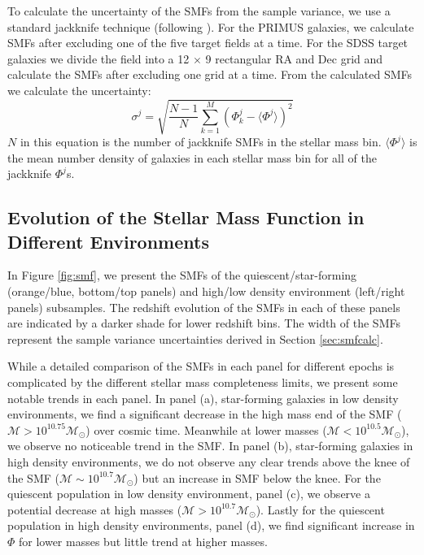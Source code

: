 \documentclass{emulateapj}
\begin{document}
To calculate the uncertainty of the SMFs from the sample variance, we use a standard jackknife technique (following \citealt{Moustakas:2013aa}). For the PRIMUS galaxies, we calculate SMFs after excluding one of the five target fields at a time. For the SDSS target galaxies we divide the field into a 12 $\times$ 9 rectangular RA and Dec grid and calculate the SMFs after excluding one grid at a time. From the calculated SMFs we calculate the uncertainty: 
\begin{equation}
\sigma^j = \sqrt{\frac{N-1}{N} \sum\limits_{k=1}^{M} (\Phi^j_k - \langle \Phi^j \rangle)^2}
\end{equation} 
$N$ in this equation is the number of jackknife SMFs in the stellar mass bin. $\langle \Phi^j \rangle$ is the mean number density of galaxies in each stellar mass bin for all of the jackknife $\Phi^j$s. 

\subsection{Evolution of the Stellar Mass Function in Different Environments} \label{sec:smfevol}
In Figure \ref{fig:smf}, we present the SMFs of the quiescent/star-forming (orange/blue, bottom/top panels) and high/low density environment (left/right panels) subsamples. The redshift evolution of the SMFs in each of these panels are indicated by a darker shade for lower redshift bins. The width of the SMFs represent the sample variance uncertainties derived in Section \ref{sec:smfcalc}.

While a detailed comparison of the SMFs in each panel for different
epochs is complicated by the different stellar mass completeness limits, we present some notable trends in each panel. In panel (a), star-forming galaxies in low density environments, we find a significant decrease in the high mass end of the SMF ($\mathcal{M} > 10^{10.75} \mathcal{M}_{\odot}$) over cosmic time. Meanwhile at lower masses ($\mathcal{M} < 10^{10.5} \mathcal{M}_{\odot}$), we observe no noticeable trend in the SMF. In panel (b), star-forming galaxies in high density environments, we do not observe any clear trends above the knee of the SMF ($\mathcal{M} \sim 10^{10.7} \mathcal{M}_{\odot}$) but an increase in SMF below the knee. For the quiescent population in low density environment, panel (c), we observe a potential decrease at high masses ($\mathcal{M} > 10^{10.7} \mathcal{M}_{\odot}$). Lastly for the quiescent population in high density environments, panel (d), we find significant increase in $\Phi$ for lower masses but little trend at higher masses. 
\end{document}

